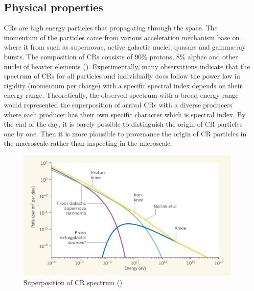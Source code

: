 \subsection{Physical properties}
CRs are high energy particles that propagating through
the space. The momentum of the particles came from
various acceleration mechanism base on where it from 
such as supernovae, active galactic nuclei, quasars 
and gamma-ray bursts. The composition of CRs consists of
90\% protons, 8\% alphas and other nuclei of heavier
elements (\cite{CRComposition2017}). Experimentally,
many observations indicate that the spectrum of CRs 
for all particles and individually does follow the 
power law in rigidity (momentum per charge) with a specific spectral index depends on 
their energy range. Theoretically, the observed spectrum
with a broad energy range would represented the superposition
of arrival CRs with a diverse producers where each producer
has their own specific character which is spectral index.
By the end of the day, it is barely possible to distinguish
the origin of CR particles one by one. Then it is more 
plausible to provenance the origin of CR particles in the 
macroscale rather than inspecting in the microscale.




\begin{figure}[h]
    \centering
    \includegraphics[width=\textwidth]{content/background/figures/andrew_superposition.png}
    \caption{Superposition of CR spectrum (\cite{taylor2016_crspectrumsuperposition})}
    \label{fig:cr_superposition}
\end{figure}

